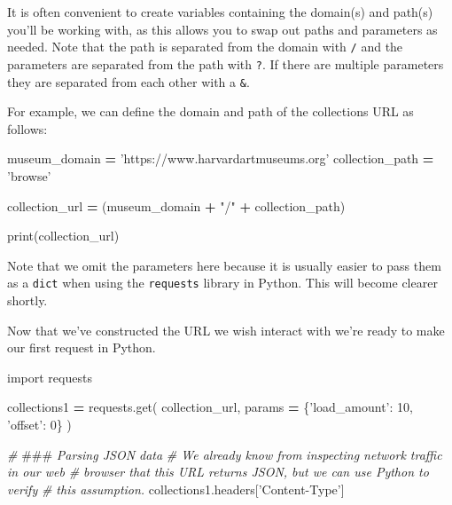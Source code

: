 \documentclass[
]{book}
\newenvironment{Shaded}{\begin{snugshade}}{\end{snugshade}}
\newcommand{\AlertTok}[1]{\textcolor[rgb]{0.94,0.16,0.16}{#1}}
\newcommand{\BuiltInTok}[1]{#1}
\newcommand{\CommentTok}[1]{\textcolor[rgb]{0.56,0.35,0.01}{\textit{#1}}}
\newcommand{\DecValTok}[1]{\textcolor[rgb]{0.00,0.00,0.81}{#1}}
\newcommand{\ImportTok}[1]{#1}
\newcommand{\NormalTok}[1]{#1}
\newcommand{\OperatorTok}[1]{\textcolor[rgb]{0.81,0.36,0.00}{\textbf{#1}}}
\newcommand{\StringTok}[1]{\textcolor[rgb]{0.31,0.60,0.02}{#1}}
\begin{document}
It is often convenient to create variables containing the domain(s)
and path(s) you'll be working with, as this allows you to swap out
paths and parameters as needed. Note that the path is separated from
the domain with \texttt{/} and the parameters are separated from the path
with \texttt{?}. If there are multiple parameters they are separated from
each other with a \texttt{\&}.

For example, we can define the domain and path of the collections URL
as follows:

\begin{Shaded}
\begin{Highlighting}[]
\NormalTok{museum_domain }\OperatorTok{=} \StringTok{'https://www.harvardartmuseums.org'}
\NormalTok{collection_path }\OperatorTok{=} \StringTok{'browse'}

\NormalTok{collection_url }\OperatorTok{=}\NormalTok{ (museum_domain}
                  \OperatorTok{+} \StringTok{"/"}
                  \OperatorTok{+}\NormalTok{ collection_path)}

\BuiltInTok{print}\NormalTok{(collection_url)}
\end{Highlighting}
\end{Shaded}

Note that we omit the parameters here because it is usually easier to
pass them as a \texttt{dict} when using the \texttt{requests} library in Python.
This will become clearer shortly.

Now that we've constructed the URL we wish interact with we're ready
to make our first request in Python.

\begin{Shaded}
\begin{Highlighting}[]
\ImportTok{import}\NormalTok{ requests}

\NormalTok{collections1 }\OperatorTok{=}\NormalTok{ requests.get(}
\NormalTok{    collection_url,}
\NormalTok{    params }\OperatorTok{=}\NormalTok{ \{}\StringTok{'load_amount'}\NormalTok{: }\DecValTok{10}\NormalTok{,}
                  \StringTok{'offset'}\NormalTok{: }\DecValTok{0}\NormalTok{\}}
\NormalTok{)}
\end{Highlighting}
\end{Shaded}

\begin{Shaded}
\begin{Highlighting}[]
\CommentTok{# }\AlertTok{###}\CommentTok{ Parsing JSON data}
\CommentTok{# We already know from inspecting network traffic in our web}
\CommentTok{# browser that this URL returns JSON, but we can use Python to verify}
\CommentTok{# this assumption.}
\NormalTok{collections1.headers[}\StringTok{'Content-Type'}\NormalTok{]}
\end{Highlighting}
\end{Shaded}
\end{document}
